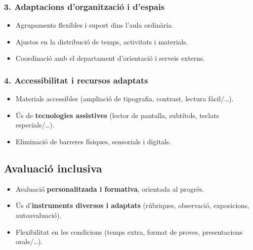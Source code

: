 \documentclass[
  paper=a4,
  ,captions=tableheading
]{scrartcl}
\providecommand{\tightlist}{%
  \setlength{\itemsep}{0pt}\setlength{\parskip}{0pt}}
\begin{document}
\hypertarget{adaptacions-dorganitzaciuxf3-i-despais}{%
\subsubsection{3. Adaptacions d'organització i
d'espais}\label{adaptacions-dorganitzaciuxf3-i-despais}}

\begin{itemize}
\tightlist
\item
  Agrupaments flexibles i suport dins l'aula ordinària.
\item
  Ajustos en la distribució de temps, activitats i materials.
\item
  Coordinació amb el departament d'orientació i serveis externs.
\end{itemize}

\hypertarget{accessibilitat-i-recursos-adaptats}{%
\subsubsection{4. Accessibilitat i recursos
adaptats}\label{accessibilitat-i-recursos-adaptats}}

\begin{itemize}
\tightlist
\item
  Materials accessibles (ampliació de tipografia, contrast, lectura
  fàcil/\ldots).
\item
  Ús de \textbf{tecnologies assistives} (lector de pantalla, subtítols,
  teclats especials/\ldots).
\item
  Eliminació de barreres físiques, sensorials i digitals.
\end{itemize}

\hypertarget{avaluaciuxf3-inclusiva}{%
\subsection{Avaluació inclusiva}\label{avaluaciuxf3-inclusiva}}

\begin{itemize}
\tightlist
\item
  Avaluació \textbf{personalitzada i formativa}, orientada al progrés.
\item
  Ús d'\textbf{instruments diversos i adaptats} (rúbriques, observació,
  exposicions, autoavaluació).
\item
  Flexibilitat en les condicions (temps extra, format de proves,
  presentacions orals/\ldots).
\end{itemize}
\end{document}
